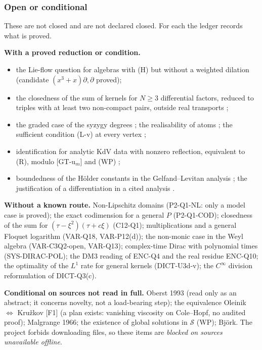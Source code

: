 \subsubsection{Open or conditional}

These are not closed and are not declared closed. For each the ledger records what is proved.

\textbf{With a proved reduction or condition.}
\begin{itemize}
\item the Lie-flow question for algebras with (H) but without a weighted dilation \openq{}  (candidate $(x^3+x)\partial,\partial$ proved);
\item the closedness of the sum of kernels for $N\ge3$ differential factors, reduced to triples with at least two non-compact pairs, outside real transports \openq{} ;
\item the graded case of the syzygy degrees \openq{} ; the realisability of atoms \openq{} ; the sufficient condition (L-v) at every vertex \openq{} ;
\item identification for analytic KdV data with nonzero reflection, equivalent to (R), modulo [GT-u$_m$] and (WP) \openq{} ;
\item boundedness of the H\"older constants in the Gelfand--Levitan analysis \openq{} \led{[GT-u$_0$]}; the justification of a differentiation in a cited analysis \openq{} \led{[GT-u$_m$]}.
\end{itemize}

\textbf{Without a known route.} Non-Lipschitz domains (P2-Q1-NL: only a model case is proved); the exact codimension for a general $P$ (P2-Q1-COD); closedness of the sum for $(\tau-\xi^2)(\tau+c\xi)$ (C12-Q1); multiplications and a general Floquet logarithm (VAR-Q18, VAR-P12(d)); the non-monic case in the Weyl algebra (VAR-C3Q2-open, VAR-Q13); complex-time Dirac with polynomial times (SYS-DIRAC-POL); the DM3 reading of ENC-Q4 and the real residue ENC-Q10; the optimality of the $L^1$ rate for general kernels (DICT-U3d-v); the $C^\infty$ division reformulation of DICT-Q3(c).

\textbf{Conditional on sources not read in full.} Oberst 1993 (read only as an abstract; it concerns novelty, not a load-bearing step); the equivalence Oleinik $\Leftrightarrow$ Kru\v zkov [F1] (a plan exists: vanishing viscosity on Cole--Hopf, no audited proof); Malgrange 1966; the existence of global solutions in $\mathcal S$ (WP); Bj\"ork. The project forbids downloading files, so these items are \emph{blocked on sources unavailable offline}.

